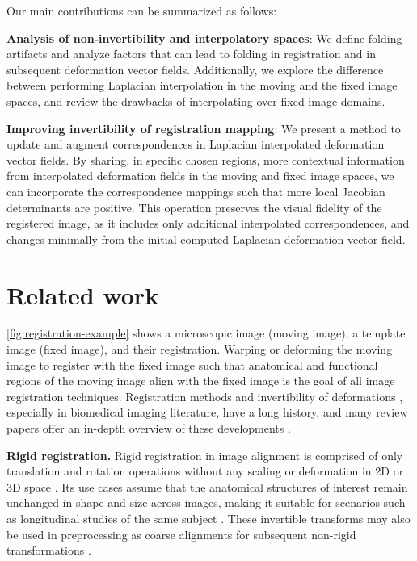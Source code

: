 \documentclass[lettersize,journal]{IEEEtran}
\begin{document}
Our main contributions can be summarized as follows:

\textbf{Analysis of non-invertibility and interpolatory spaces}: We define folding artifacts and analyze factors that can lead to folding in registration and in subsequent deformation vector fields. Additionally, we explore the difference between performing Laplacian interpolation in the moving and the fixed image spaces, and review the drawbacks of interpolating over fixed image domains.

\textbf{Improving invertibility of registration mapping}: We present a method to update and augment correspondences in Laplacian interpolated deformation vector fields. By sharing, in specific chosen regions, more contextual information from interpolated deformation fields in the moving and fixed image spaces, we can incorporate the correspondence mappings such that more local Jacobian determinants are positive. This operation preserves the visual fidelity of the registered image, as it includes only additional interpolated correspondences, and changes minimally from the initial computed Laplacian deformation vector field.


\section{Related work}
\label{sec:related_work}

\autoref{fig:registration-example} shows a microscopic image (moving image), a template image (fixed image), and their registration. Warping or deforming the moving image to register with the fixed image such that anatomical and functional regions of the moving image align with the fixed image is the goal of all image registration techniques. Registration methods and invertibility of deformations \cite{Dupuis1998}, especially in biomedical imaging literature, have a long history, and many review papers offer an in-depth overview of these developments \cite{KLEIN2009786}.

\textbf{Rigid registration.}
Rigid registration in image alignment is comprised of only translation and rotation operations without any scaling or deformation in 2D or 3D space \cite{Zhang1994IterativePM}. Its use cases assume that the anatomical structures of interest remain unchanged in shape and size across images, making it suitable for scenarios such as longitudinal studies of the same subject \cite{REUTER20101181}. These invertible transforms may also be used in preprocessing as coarse alignments for subsequent non-rigid transformations \cite{Frackowiak2004-yy}.
\end{document}
